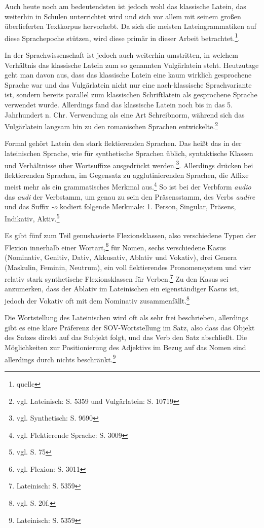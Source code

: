 \documentclass[fontsize=12pt,abstract=on,titlepage,bibliography=totoc,ngerman,listof=totoc]{scrreprt}
\begin{document}
Auch heute noch am bedeutendsten ist jedoch wohl das klassische Latein, das weiterhin in Schulen unterrichtet wird und sich vor allem mit seinem großen überlieferten Textkorpus hervorhebt. Da sich die meisten Lateingrammatiken auf diese Sprachepoche stützen, wird diese primär in dieser Arbeit betrachtet.\footnote{quelle}. \par
In der Sprachwissenschaft ist jedoch auch weiterhin umstritten, in welchem Verhältnis das klassische Latein zum so genannten Vulgärlatein steht. Heutzutage geht man davon aus, dass das klassische Latein eine kaum wirklich gesprochene Sprache war und das Vulgärlatein nicht nur eine nach-klassische Sprachvariante ist, sondern bereits parallel zum klassischen Schriftlatein als gesprochene Sprache verwendet wurde. Allerdings fand das klassische Latein noch bis in das 5. Jahrhundert n. Chr. Verwendung als eine Art Schreibnorm, während sich das Vulgärlatein langsam hin zu den romanischen Sprachen entwickelte.\footnote{vgl. \cite{METZLER2004} Lateinisch: S. 5359 und Vulgärlatein: S. 10719} \par
Formal gehört Latein den stark flektierenden Sprachen. Das heißt das in der lateinischen Sprache, wie für synthetische Sprachen üblich, syntaktische Klassen und Verhältnisse über Wortsuffixe ausgedrückt werden.\footnote{vgl. \cite{METZLER2004} Synthetisch: S. 9690}. Allerdings drücken bei flektierenden Sprachen, im Gegensatz zu agglutinierenden Sprachen, die Affixe meist mehr als ein grammatisches Merkmal aus.\footnote{vgl. \cite{METZLER2004} Flektierende Sprache: S. 3009} So ist bei der Verbform \textit{audio} das \textit{audi} der Verbstamm, um genau zu sein den Präsensstamm, des Verbs \textit{audire} und das Suffix \textit{-o} kodiert folgende Merkmale: 1. Person, Singular, Präsens, Indikativ, Aktiv.\footnote{vgl. \cite{BAYER-LINDAUER1994} S. 75} \par
Es gibt fünf zum Teil genusbasierte Flexionsklassen, also verschiedene Typen der Flexion innerhalb einer Wortart,\footnote{vgl. \cite{METZLER2004} Flexion: S. 3011} für Nomen, sechs verschiedene Kasus (Nominativ, Genitiv, Dativ, Akkusativ, Ablativ und Vokativ), drei Genera (Maskulin, Feminin, Neutrum), ein voll flektierendes Pronomensystem und vier relativ stark synthetische Flexionsklassen für Verben.\footnote{\cite{METZLER2004} Lateinisch: S. 5359} Zu den Kasus sei anzumerken, dass der Ablativ im Lateinischen ein eigenständiger Kasus ist, jedoch der Vokativ oft mit dem Nominativ zusammenfällt.\footnote{vgl. \cite{BAYER-LINDAUER1994} S. 20f.} \par
Die Wortstellung des Lateinischen wird oft als sehr frei beschrieben, allerdings gibt es eine klare Präferenz der SOV-Wortstellung im Satz, also dass das Objekt des Satzes direkt auf das Subjekt folgt, und das Verb den Satz abschließt. Die Möglichkeiten zur Positionierung des Adjektivs im Bezug auf das Nomen sind allerdings durch nichts beschränkt.\footnote{\cite{METZLER2004} Lateinisch: S. 5359}
\end{document}
